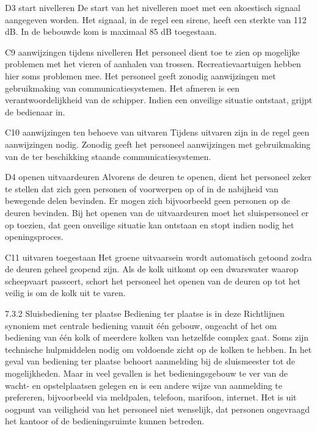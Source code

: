 D3 start nivelleren
De start van het nivelleren moet met een akoestisch signaal aangegeven worden.
Het signaal, in de regel een sirene, heeft een sterkte van 112 dB. In de bebouwde kom is
maximaal 85 dB toegestaan.

C9 aanwijzingen tijdens nivelleren
Het personeel dient toe te zien op mogelijke problemen met het vieren of aanhalen van
trossen. Recreatievaartuigen hebben hier soms problemen mee. Het personeel geeft
zonodig aanwijzingen met gebruikmaking van communicatiesystemen. Het afmeren is
een verantwoordelijkheid van de schipper. Indien een onveilige situatie ontstaat, grijpt
de bedienaar in.

C10 aanwijzingen ten behoeve van uitvaren
Tijdens uitvaren zijn in de regel geen aanwijzingen nodig. Zonodig geeft het personeel
aanwijzingen met gebruikmaking van de ter beschikking staande communicatiesystemen.


D4 openen uitvaardeuren
Alvorens de deuren te openen, dient het personeel zeker te stellen dat zich geen personen of voorwerpen op of in de nabijheid van bewegende delen bevinden. Er mogen zich
bijvoorbeeld geen personen op de deuren bevinden. Bij het openen van de uitvaardeuren
moet het sluispersoneel er op toezien, dat geen onveilige situatie kan ontstaan en stopt
indien nodig het openingsproces.

C11 uitvaren toegestaan
Het groene uitvaarsein wordt automatisch getoond zodra de deuren geheel geopend zijn.
Als de kolk uitkomt op een dwarswater waarop scheepvaart passeert, schort het
personeel het openen van de deuren op tot het veilig is om de kolk uit te varen.

7.3.2 Sluisbediening ter plaatse
Bediening ter plaatse is in deze Richtlijnen synoniem met centrale bediening vanuit één
gebouw, ongeacht of het om bediening van één kolk of meerdere kolken van hetzelfde complex
gaat. Soms zijn technische hulpmiddelen nodig om voldoende zicht op de kolken te hebben.
In het geval van bediening ter plaatse behoort aanmelding bij de sluismeester tot de mogelijkheden. Maar in veel gevallen is het bedieningsgebouw te ver van de wacht- en opstelplaatsen
gelegen en is een andere wijze van aanmelding te prefereren, bijvoorbeeld via meldpalen,
telefoon, marifoon, internet. Het is uit oogpunt van veiligheid van het personeel niet wenselijk,
dat personen ongevraagd het kantoor of de bedieningsruimte kunnen betreden.

